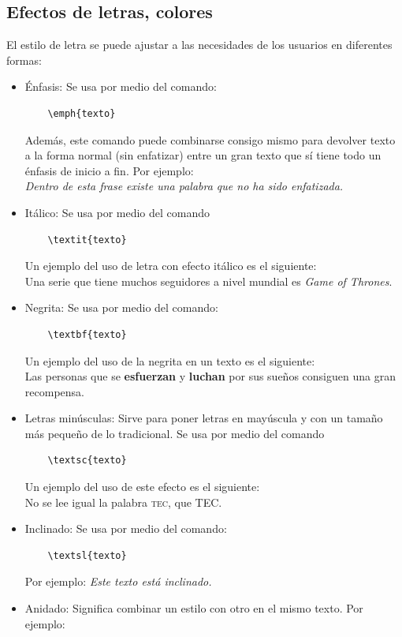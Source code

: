 \documentclass[10pt,journal,compsoc]{IEEEtran}
\begin{document}
\subsection{Efectos de letras, colores}
El estilo de letra se puede ajustar a las necesidades de los usuarios en diferentes formas:
\begin{itemize}
	\item \'Enfasis: Se usa por medio del comando:
	\begin{lstlisting}
	\emph{texto}
	\end{lstlisting}
	Adem\'as, este comando puede combinarse consigo mismo para devolver texto a la forma normal (sin enfatizar) entre un gran texto que s\'i tiene todo un \'enfasis de inicio a fin. Por ejemplo: \\
	\emph{Dentro de esta frase existe una \emph{palabra} que no ha sido enfatizada.}
	\item It\'alico: Se usa por medio del comando 
	\begin{lstlisting}
	\textit{texto}
	\end{lstlisting}
	Un ejemplo del uso de letra con efecto it\'alico es el siguiente: \\
	Una serie que tiene muchos seguidores a nivel mundial es \textit{Game of Thrones}.
	\item Negrita: Se usa por medio del comando:
	\begin{lstlisting}
	\textbf{texto}
	\end{lstlisting}
	Un ejemplo del uso de la negrita en un texto es el siguiente:\\
	Las personas que se \textbf{esfuerzan} y \textbf{luchan} por sus sue\~nos consiguen una gran recompensa.
	\item Letras min\'usculas: Sirve para poner letras en may\'uscula y con un tama\~no m\'as peque\~no de lo tradicional. Se usa por medio del comando 
	\begin{lstlisting}
	\textsc{texto}
	\end{lstlisting}
	Un ejemplo del uso de este efecto es el siguiente: \\
	No se lee igual la palabra \textsc{tec}, que TEC. 
	\item Inclinado: Se usa por medio del comando:
	\begin{lstlisting}
	\textsl{texto}
	\end{lstlisting}
	Por ejemplo: \textsl{Este texto est\'a inclinado.}
	\item Anidado: Significa combinar un estilo con otro en el mismo texto. Por ejemplo:

\end{itemize}
\end{document}
